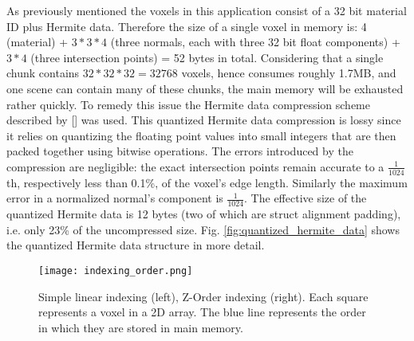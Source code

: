 As previously mentioned the voxels in this application consist of a 32 bit material ID plus Hermite data. Therefore the size of a single voxel in memory is: 4 (material) + $3*3*4$ (three normals, each with three 32 bit float components) + $3*4$ (three intersection points) = 52 bytes in total. Considering that a single chunk contains $32 * 32 * 32 = 32768$ voxels, hence consumes roughly 1.7MB, and one scene can contain many of these chunks,
the main memory will be exhausted rather quickly.
To remedy this issue the Hermite data compression scheme described by [] was used.
This quantized Hermite data compression is lossy since it relies on quantizing the floating point values into small integers that are then packed together using bitwise operations. The errors introduced by the compression are
negligible: the exact intersection points remain accurate to a $\frac{1}{1024}$th, respectively less than 0.1\%, of the voxel's edge length. Similarly the maximum error in a normalized normal's component is $\frac{1}{1024}$.
The effective size of the quantized Hermite data is 12 bytes (two of which are struct alignment padding), i.e. only 23\% of the uncompressed size. Fig. \ref{fig:quantized_hermite_data} shows the quantized Hermite data
structure in more detail.\\

\newpage

\begin{wrapfigure}{R}{0.4\textwidth}
\texttt{[image: indexing\_order.png]}
\caption{Simple linear indexing (left), Z-Order indexing (right). Each square represents a voxel in a 2D array. The blue line represents the order in which they are stored in main memory.}
\label{fig:indexing_order}
\end{wrapfigure}

